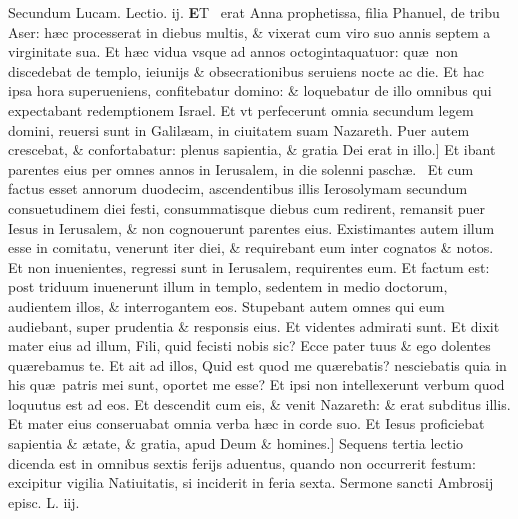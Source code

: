 \documentclass[a5paper,10pt]{book}
\def\leftmarginnote{%
	\lrmarginnote{\hskip -\marginparsep \hskip -6.5em}}
\def\ae{æ}
\begin{document}
\begin{multicols*}{2}
\fancyhead[C]{\color{red} Feria. vj. Dominic\ae . j. aduentus}
\newline \color{red} Secundum Lucam. \hfill Lectio. ij. \color{black}
\vspace{-.25em}
\lettrine[lines=2]{\bfseries \color{red} E}{}T \textdagger \ erat\leftmarginnote{\begin{flushright}c.2.f\end{flushright}} Anna prophetissa, filia Phanuel, de tribu Aser: h\ae c processerat in diebus multis, \& vixerat cum viro suo annis septem a virginitate sua.
Et h\ae c vidua vsque ad annos octogintaquatuor: qu\ae \ non discedebat de templo, ieiunijs \& obsecrationibus seruiens nocte ac die.
Et hac ipsa hora superueniens, confitebatur domino: \& loquebatur de illo omnibus qui expectabant redemptionem Israel.
Et vt perfecerunt omnia secundum legem domini, reuersi sunt in Galil\ae am, in ciuitatem suam Nazareth.
Puer autem crescebat, \& confortabatur: plenus sapientia, \& gratia Dei erat in illo.]
Et\leftmarginnote{\begin{flushright}G\end{flushright}} ibant parentes eius per omnes annos in Ierusalem, in die solenni pasch\ae . \textdagger \ 
Et cum factus esset annorum duodecim, ascendentibus illis Ierosolymam secundum consuetudinem diei festi, consummatisque diebus cum redirent, remansit puer Iesus in Ierusalem, \& non cognouerunt parentes eius.
Existimantes autem illum esse in comitatu, venerunt iter diei, \& requirebant eum inter cognatos \& notos.
Et non inuenientes, regressi sunt in Ierusalem, requirentes eum. Et factum est: post triduum inuenerunt illum in templo, sedentem in medio doctorum, audientem illos, \& interrogantem eos.
Stupebant autem omnes qui eum audiebant, super prudentia \& responsis eius.
Et videntes admirati sunt. Et dixit mater eius ad illum, Fili, quid fecisti nobis sic?
Ecce pater tuus \& ego dolentes qu\ae rebamus te.
Et ait ad illos, Quid est quod me qu\ae rebatis? nesciebatis quia in his qu\ae \ patris mei sunt, oportet me esse?
Et ipsi non intellexerunt verbum quod loquutus est ad eos. Et descendit cum eis, \& venit Nazareth: \& erat subditus illis.
Et mater eius conseruabat omnia verba h\ae c in corde suo. Et Iesus proficiebat sapientia \& \ae tate, \& gratia, apud Deum \& homines.]
\newline \textswab{C} \color{red} Sequens tertia lectio dicenda est in omnibus sextis ferijs aduentus, quando non occurrerit festum: excipitur vigilia Natiuitatis, si inciderit in feria sexta. \color{black}
\newline \color{red} Sermone sancti Ambrosij episc. L. iij. \color{black}

\end{multicols*}
\end{document}
